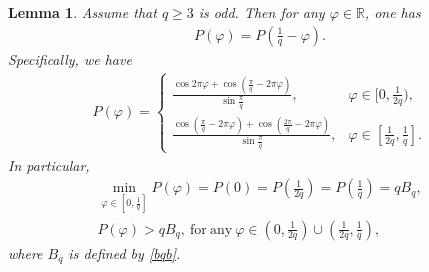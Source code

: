 \documentclass[12pt]{amsart}
\theoremstyle{plain}
\newtheorem{lemma}[theorem]{Lemma}
\theoremstyle{definition}
\begin{document}
	\begin{lemma}\label{lsscc}
		Assume that $q\geq 3$ is odd. Then for any $\varphi\in \mathbb{R}$, one has
		\begin{align}\label{pqduichen}
			P(\varphi)=P\left(\frac{1}{q}-\varphi\right).
		\end{align} 
		Specifically, we have
		\begin{align}
			\label{sscc}P(\varphi)=\begin{cases}
				\frac{\cos2\pi\varphi+\cos\left(\frac{\pi}{q}-2\pi\varphi\right)}{\sin\frac{\pi}{q}},&\varphi\in\Big[0,\frac{1}{2q}\Big),\\
				\frac{\cos\left(\frac{\pi}{q}-2\pi\varphi\right)+\cos\left(\frac{2\pi}{q}-2\pi\varphi\right)}{\sin\frac{\pi}{q}},& \varphi\in\left[\frac{1}{2q},\frac{1}{q}\right].
			\end{cases}
		\end{align}
		In particular,
\begin{align}
\min_{\varphi\in\left[0,\frac{1}{q}\right]}P(\varphi)=P(0)=P\left(\frac{1}{2q}\right)=P\left(\frac{1}{q}\right)=qB_q,\label{Bq}\\
P(\varphi)>qB_q,\ \mathrm{for\ any\ } \varphi\in \left(0,\frac{1}{2q}\right)\cup\left(\frac{1}{2q},\frac{1}{q}\right),\label{Bqleq1toqPqtheta}
\end{align}
		where  $B_q$ is defined by \eqref{bqb}. 
	\end{lemma} 
\end{document}
